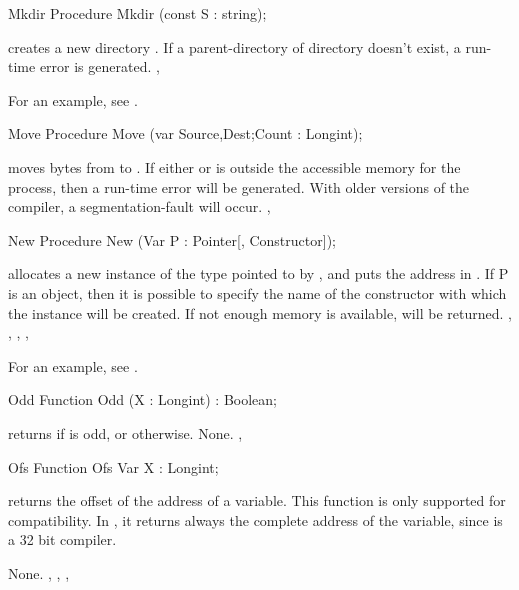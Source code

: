 \documentclass{report}
\begin{document}
\html{}
\begin{procedure}{Mkdir}
\Declaration
Procedure Mkdir (const S : string);

\Description
{} creates a new  directory .
\Errors
If a parent-directory of directory  doesn't exist, a run-time error is generated.
\SeeAlso
{}, 
\end{procedure}
For an example, see .
\begin{procedure}{Move}
\Declaration
Procedure Move (var Source,Dest;Count : Longint);

\Description
{} moves  bytes from  to .
\Errors
If either  or  is outside the accessible memory for
the process, then a run-time error will be generated. With older versions of
the compiler, a segmentation-fault will occur.
\SeeAlso
{}, 
\end{procedure}
\html{}
\begin{procedure}{New}
\Declaration
Procedure New (Var P : Pointer[, Constructor]);

\Description
{} allocates a new instance of the type pointed to by , and
puts the address in .
If P is an object, then it is possible to
specify the name of the constructor with which the instance will be created.
\Errors
If not enough memory is available,  will be returned.
\SeeAlso
{}, , , ,
\end{procedure}
For an example, see .
\begin{function}{Odd}
\Declaration
Function Odd (X : Longint) : Boolean;

\Description
{} returns  if  is odd, or  otherwise.
\Errors
None.
\SeeAlso
{}, 
\end{function}
\html{}
\begin{function}{Ofs}
\Declaration
Function Ofs Var X : Longint;

\Description
{} returns the offset of the address of a variable.
This function is only supported for compatibility. In \fpc, it
returns always the complete address of the variable, since \fpc is a 32 bit
compiler.

\Errors
None.
\SeeAlso
{}, , , 
\end{function}
\end{document}
